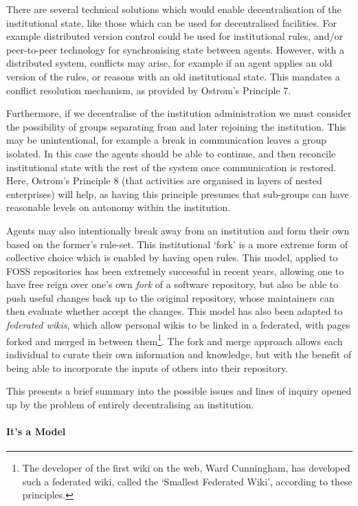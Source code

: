 There are several technical solutions which would enable decentralisation of
the institutional state, like those which can be used for decentralised
facilities. For example distributed version control could be used for
institutional rules, and/or peer-to-peer technology for synchronising state
between agents. However, with a distributed system, conflicts may arise, for
example if an agent applies an old version of the rules, or reasons with an
old institutional state. This mandates a conflict resolution mechanism, as
provided by Ostrom's Principle 7.

Furthermore, if we decentralise of the institution administration we must
consider the possibility of groups separating from and later rejoining the
institution. This may be unintentional, for example a break in communication
leaves a group isolated. In this case the agents should be able to continue,
and then reconcile institutional state with the rest of the system once
communication is restored. Here, Ostrom's Principle 8 (that activities are
organised in layers of nested enterprises) will help, as having this principle
presumes that sub-groups can have reasonable levels on autonomy within the
institution.

Agents may also intentionally break away from an institution and form their
own based on the former's rule-set. This institutional `fork' is a more
extreme form of collective choice which is enabled by having open rules. This
model, applied to \ac{FOSS} repositories has been extremely successful in
recent years, allowing one to have free reign over one's own \emph{fork} of a
software repository, but also be able to push useful changes back up to the
original repository, whose maintainers can then evaluate whether accept the
changes. This model has also been adapted to \emph{federated wikis}, which
allow personal wikis to be linked in a federated, with pages forked and merged
in between them\footnote{The developer of the first wiki on the web, Ward
Cunningham, has developed such a federated wiki, called the `Smallest
Federated Wiki', according to these principles.}. The fork and merge approach
allows each individual to curate their own information and knowledge, but with
the benefit of being able to incorporate the inputs of others into their
repository.

This presents a brief summary into the possible issues and lines of inquiry opened up by the problem of entirely decentralising an institution.

\paragraph{It's a Model}

